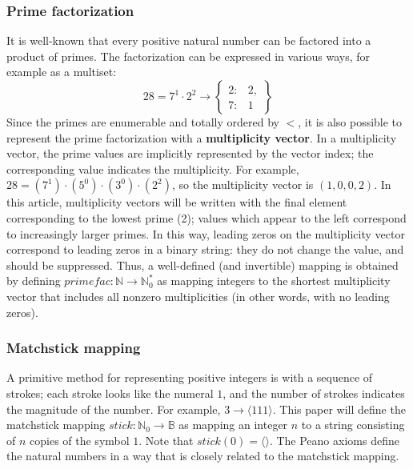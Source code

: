 \documentclass[12pt,reqno]{article}
\begin{document}
\subsubsection{Prime factorization}

It is well-known that every positive natural number can be factored into a product of primes. The factorization can be expressed in various ways, for example as a multiset:
\begin{equation}
28 = 7^1 \cdot 2^2 \rightarrow \begin{Bmatrix}
        2: & 2, \\
        7: & 1
    \end{Bmatrix}
\end {equation}
Since the primes are enumerable and totally ordered by $<$, it is also possible to represent the prime factorization with a \textbf{multiplicity vector}. In a multiplicity vector, the prime values are implicitly represented by the vector index; the corresponding value indicates the multiplicity. For example, $28 = (7^1) \cdot (5^0) \cdot (3^0) \cdot (2^2)$, so the multiplicity vector is $(1, 0, 0, 2)$. In this article, multiplicity vectors will be written with the final element corresponding to the lowest prime (2); values which appear to the left correspond to increasingly larger primes. In this way, leading zeros on the multiplicity vector correspond to leading zeros in a binary string: they do not change the value, and should be suppressed. Thus, a well-defined (and invertible) mapping is obtained by defining $primefac : \mathbb{N} \rightarrow \mathbb{N}_0^{*}$ as mapping integers to the shortest multiplicity vector that includes all nonzero multiplicities (in other words, with no leading zeros).

\subsubsection{Matchstick mapping}

A primitive method for representing positive integers is with a sequence of strokes; each stroke looks like the numeral $1$, and the number of strokes indicates the magnitude of the number. For example, $3 \rightarrow \langle 111 \rangle$. This paper will define the matchstick mapping $stick : \mathbb{N}_0 \rightarrow \mathbb{B}$ as mapping an integer $n$ to a string consisting of $n$ copies of the symbol $1$. Note that $stick(0) = \langle \rangle$. The Peano axioms define the natural numbers in a way that is closely related to the matchstick mapping.
\end{document}
